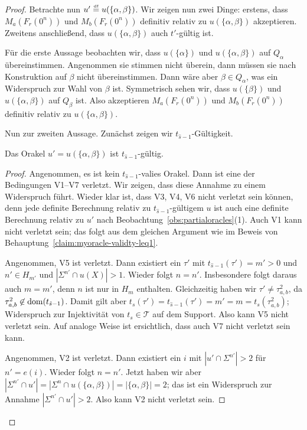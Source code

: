\begin{proof}
Betrachte nun $u'\stackrel{\text{\smash{\tiny df}}}{=} u(\{\alpha, \beta\})$. Wir zeigen nun zwei Dinge: erstens, dass $M_a(F_r(0^n))$ und $M_b(F_r(0^n))$ definitiv relativ zu $u(\{\alpha, \beta\})$ akzeptieren.
Zweitens anschließend, dass $u(\{\alpha,\beta\})$ auch $t'$-gültig ist.

Für die erste Aussage beobachten wir, dass $u(\{\alpha\})$ und $u(\{\alpha, \beta\})$ auf $Q_\alpha$ übereinstimmen. Angenommen sie stimmen nicht überein, dann müssen sie nach Konstruktion auf $\beta$ nicht übereinstimmen. Dann wäre aber $\beta\in Q_\alpha$, was ein Widerspruch zur Wahl von $\beta$ ist.
Symmetrisch sehen wir, dass $u(\{\beta\})$ und $u(\{\alpha, \beta\})$ auf $Q_\beta$ ist.
Also akzeptieren $M_a(F_r(0^n))$ und $M_b(F_r(0^n))$ definitiv relativ zu $u(\{\alpha, \beta\})$.

Nun zur zweiten Aussage. Zunächst zeigen wir $t_{\hat{s}-1}$-Gültigkeit.
\begin{claim}\label{claim:myoracle-validty-eq2}
    Das Orakel $u'=u(\{\alpha, \beta\})$ ist $t_{\hat{s}-1}$-gültig.
\end{claim}
\begin{proof}
    Angenommen, es ist kein $t_{\hat{s}-1}$-valies Orakel. Dann ist eine der Bedingungen V1--V7 verletzt. Wir zeigen, dass diese Annahme zu einem Widerspruch führt.
    Wieder klar ist, dass V3, V4, V6 nicht verletzt sein können, denn jede definite Berechnung relativ zu $t_{\hat{s}-1}$-gültigem $u$ ist auch eine definite Berechnung relativ zu $u'$ nach Beobachtung~\ref{obs:partialoracles}(1).
    Auch V1 kann nicht verletzt sein; das folgt aus dem gleichen Argument wie im Beweis von Behauptung~\ref{claim:myoracle-validty-leq1}.

    Angenommen, V5 ist verletzt. Dann existiert ein $\tau'$ mit $t_{\hat{s}-1}(\tau')=m'>0$ und $n'\in H_{m'}$ und $|\Sigma^{n'}\cap u(X)|>1$. 
    Wieder folgt $n=n'$.
    Insbesondere folgt daraus auch $m=m'$, denn $n$ ist nur in $H_m$ enthalten.
    Gleichzeitig haben wir $\tau'\neq \tau^2_{a,b}$, da $\tau^2_{a,b}\not\in\operatorname{dom}(t_{\hat{s}-1})$.
    Damit gilt aber $t_s(\tau')=t_{\hat{s}-1}(\tau')=m'=m=t_s(\tau^2_{a,b})$; Widerspruch zur Injektivität von $t_s\in\mathcal T$ auf dem Support.
    Also kann V5 nicht verletzt sein. 
    Auf analoge Weise ist ersichtlich, dass auch V7 nicht verletzt sein kann.

    Angenommen, V2 ist verletzt. Dann existiert ein $i$ mit $|u'\cap\Sigma^{n'}|>2$ für $n'=e(i)$.
    Wieder folgt $n=n'$.
    Jetzt haben wir aber $|\Sigma^{n'}\cap u'|=|\Sigma^n\cap u(\{\alpha, \beta\})| = |\{\alpha,\beta\}|=2$; das ist ein Widerspruch zur Annahme $|\Sigma^{n'}\cap u'|>2$. Also kann V2 nicht verletzt sein. 


\end{proof}
\end{proof}
